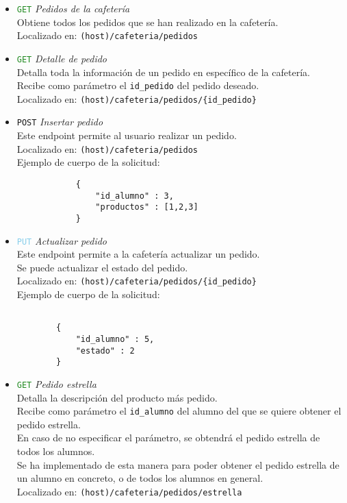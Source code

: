 \documentclass[12pt]{report}
\begin{document}
\begin{itemize}
\begin{itemize}
\begin{itemize}
        \item \textcolor{ForestGreen}{\texttt{GET}} \textit{Pedidos de la cafetería}\\
        Obtiene todos los pedidos que se han realizado en la cafetería.\\
        Localizado en: \texttt{(host)/cafeteria/pedidos}
        \item \textcolor{ForestGreen}{\texttt{GET}} \textit{Detalle de pedido}\\
        Detalla toda la información de un pedido en específico de la cafetería.\\
        Recibe como parámetro el \texttt{id\_pedido} del pedido deseado.\\
        Localizado en: \texttt{(host)/cafeteria/pedidos/\{id\_pedido\}}
        \item \textcolor{YellowOrange}{\texttt{POST}} \textit{Insertar pedido}\\
        Este endpoint permite al usuario realizar un pedido.\\
        Localizado en: \texttt{(host)/cafeteria/pedidos}
        \\Ejemplo de cuerpo de la solicitud:
        \begin{verbatim}
            {
                "id_alumno" : 3,
                "productos" : [1,2,3]
            }
        \end{verbatim}

        \item \textcolor{SkyBlue}{\texttt{PUT}} \textit{Actualizar pedido}\\
        Este endpoint permite a la cafetería actualizar un pedido.\\
        Se puede actualizar el estado del pedido.\\
        Localizado en: \texttt{(host)/cafeteria/pedidos/\{id\_pedido\}}
        \\Ejemplo de cuerpo de la solicitud:
        \begin{verbatim}
            
        {
            "id_alumno" : 5,
            "estado" : 2
        }
        \end{verbatim}
        \item \textcolor{ForestGreen}{\texttt{GET}} \textit{Pedido estrella}\\
        Detalla la descripción del producto más pedido.\\
        Recibe como parámetro el \texttt{id\_alumno} del alumno del que se quiere obtener el pedido estrella.\\
        En caso de no especificar el parámetro, se obtendrá el pedido estrella de todos los alumnos.\\
        Se ha implementado de esta manera para poder obtener el pedido estrella de un alumno en concreto, o de todos los alumnos en general.\\
        Localizado en: \texttt{(host)/cafeteria/pedidos/estrella}


\end{itemize}
\end{itemize}
\end{itemize}
\end{document}
